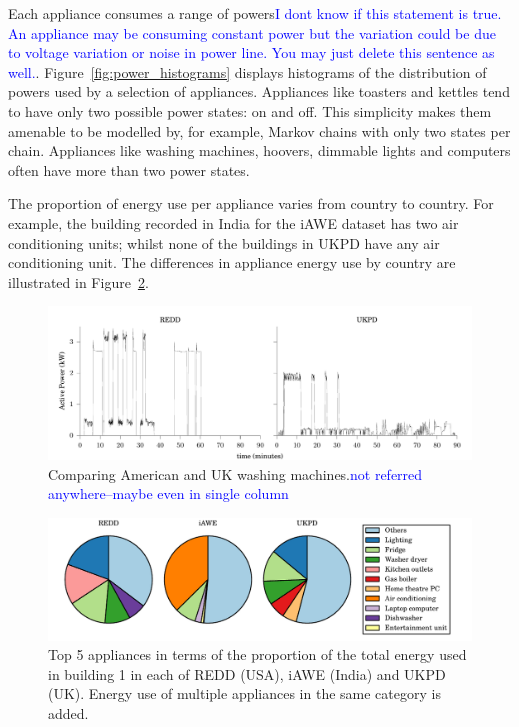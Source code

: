\documentclass{sig-alternate}
\newcommand{\bluecolor}[1]{\textcolor{blue}{#1}}
\begin{document}
\noindent
Each appliance consumes a range of
powers\bluecolor{I dont know if this statement is true. An appliance may be consuming constant power but the variation could be due to voltage variation or noise in power line. You may just delete this sentence as well.}. Figure~\ref{fig:power_histograms} displays histograms of the
distribution of powers used by a selection of appliances.  Appliances
like toasters and kettles tend to have only two possible power states:
on and off.  This simplicity makes them amenable to be modelled by,
for example, Markov chains with only two states per chain.  Appliances
like washing machines, hoovers, dimmable lights and computers often
have more than two power states.

The proportion of energy use per appliance varies from country to
country. For example, the building recorded in India for the iAWE
dataset has two air conditioning units; whilst none of the buildings
in UKPD have any air conditioning unit.  The differences in appliance
energy use by country are illustrated in Figure~\ref{fig:pie}.

\begin{figure}
  \centering
  \includegraphics{figures/wm.pdf}
  \caption{Comparing American and UK washing machines.\bluecolor{not referred anywhere--maybe even in single column}}
  \label{fig:wm}
\end{figure} 

\begin{figure}
 \centering
 \includegraphics{figures/top_k_appliances_pie.pdf}
 \caption{Top 5 appliances in terms of the proportion of the total
   energy used in building 1 in each of REDD (USA), iAWE (India) and
   UKPD (UK). Energy use of multiple appliances in the same category is added.}
 \label{fig:pie}
\end{figure}
\end{document}
